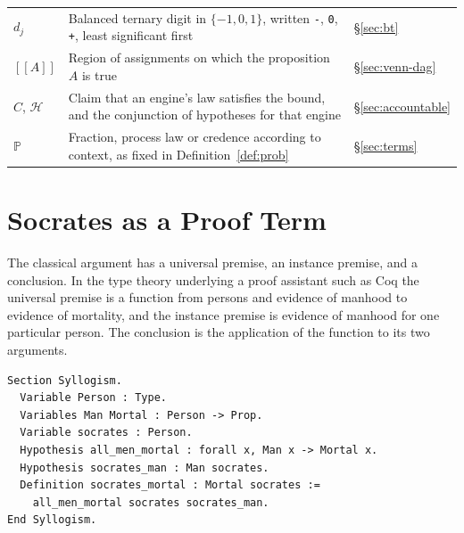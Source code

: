 \documentclass[11pt]{article}
\theoremstyle{definition}
\theoremstyle{remark}
\renewcommand{\Pr}{\mathbb{P}}
\newcommand{\llbracket}{[\![}
\newcommand{\rrbracket}{]\!]}
\newcommand{\bt}[1]{\texttt{#1}}
\begin{document}
{\begin{longtable}{@{}p{}p{}p{}@{}}
$d_j$ & Balanced ternary digit in $\{-1,0,1\}$, written \bt{-}, \bt{0}, \bt{+}, least significant first & \S\ref{sec:bt} \\
$\llbracket A\rrbracket$ & Region of assignments on which the proposition $A$ is true & \S\ref{sec:venn-dag} \\
$C$, $\mathcal{H}$ & Claim that an engine's law satisfies the bound, and the conjunction of hypotheses for that engine & \S\ref{sec:accountable} \\
$\Pr$ & Fraction, process law or credence according to context, as fixed in Definition~\ref{def:prob} & \S\ref{sec:terms} \\
\end{longtable}
}

\section{Socrates as a Proof Term}\label{sec:socrates}

The classical argument has a universal premise, an instance premise, and a conclusion. In the type theory underlying a proof assistant such as Coq \cite{bertot2004} the universal premise is a function from persons and evidence of manhood to evidence of mortality, and the instance premise is evidence of manhood for one particular person. The conclusion is the application of the function to its two arguments.

\begin{Verbatim}[fontsize=\small,xleftmargin=1.5em]
Section Syllogism.
  Variable Person : Type.
  Variables Man Mortal : Person -> Prop.
  Variable socrates : Person.
  Hypothesis all_men_mortal : forall x, Man x -> Mortal x.
  Hypothesis socrates_man : Man socrates.
  Definition socrates_mortal : Mortal socrates :=
    all_men_mortal socrates socrates_man.
End Syllogism.
\end{Verbatim}
\end{document}
